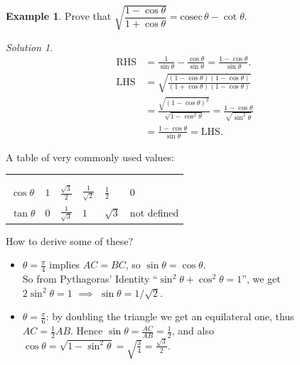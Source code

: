 \documentclass[
  12pt,
  oneside]{book}
\providecommand{\tightlist}{%
  \setlength{\itemsep}{0pt}\setlength{\parskip}{0pt}}
\theoremstyle{definition}
\theoremstyle{definition}
\newtheorem{example}{Example}[chapter]
\theoremstyle{definition}
\theoremstyle{definition}
\theoremstyle{remark}
\newtheorem*{solution}{Solution}
\begin{document}
\begin{example}
Prove that \(\sqrt{\dfrac{1-\cos\theta}{1+\cos\theta}} = \mathrm{cosec}\,\theta-\cot\theta\).
\end{example}

\begin{solution}
\begin{align*}
\mathrm{RHS} &= \frac{1}{\sin\theta}-\frac{\cos\theta}{\sin\theta}= \frac{1-\cos\theta}{\sin\theta}.\\
\mathrm{LHS} &= \sqrt{\frac{(1-\cos\theta)(1-\cos\theta)}{(1+\cos\theta)(1-\cos\theta)}} \\
&= \frac{\sqrt{(1-\cos\theta)^2}}{\sqrt{1-\cos^2\theta}} = \frac{1-\cos\theta}{\sqrt{\sin^2\theta}}\\
&= \frac{1-\cos\theta}{\sin\theta} = \mathrm{LHS}.
\end{align*}
\end{solution}

A table of very commonly used values:

\begin{longtable}[]{@{}
  >{\raggedright\arraybackslash}p{}
  >{\centering\arraybackslash}p{}
  >{\centering\arraybackslash}p{}
  >{\centering\arraybackslash}p{}
  >{\centering\arraybackslash}p{}
  >{\centering\arraybackslash}p{}@{}}
\toprule()
\endhead
\multirow{2}{*}{\(\theta\)
:---------------
\(\sin\theta\)} & \multirow{2}{*}{\(0\)
:-----:
\(0\)} & \multirow{2}{*}{\(\frac{\pi}6\)
:------------------:
\(\frac12\)} & \multirow{2}{*}{\(\frac{\pi}4\)
:------------------:
\(\frac1{\sqrt2}\)} & \multirow{2}{*}{\(\frac{\pi}3\)
:------------------:
\(\frac{\sqrt3}2\)} & \multirow{2}{*}{\(\frac{\pi}2\)
:---------------:
\(1\)} \\
 \\
\(\cos\theta\) & \(1\) & \(\frac{\sqrt3}2\) & \(\frac1{\sqrt2}\) & \(\frac12\) & \(0\) \\
\(\tan\theta\) & \(0\) & \(\frac1{\sqrt3}\) & \(1\) & \(\sqrt3\) & not defined \\
\bottomrule()
\end{longtable}

How to derive some of these?

\begin{itemize}
\tightlist
\item
  \(\theta=\frac{\pi}4\) implies \(AC=BC\), so \(\sin\theta=\cos\theta\).\\
  So from Pythagoras' Identity ``\(\sin^2\theta+\cos^2\theta=1\)'', we get\\
  \(2\sin^2\theta=1\) \(\implies\) \(\sin\theta=1/\sqrt2\).
\item
  \(\theta=\frac{\pi}{6}\): by doubling the triangle we get an equilateral one, thus\\
  \(AC=\frac12AB\). Hence \(\sin\theta=\frac{AC}{AB}=\frac12\), and also\\
  \(\cos\theta=\sqrt{1-\sin^2\theta} = \sqrt{\frac34} = \frac{\sqrt{3}}2\).
\end{itemize}
\end{document}
